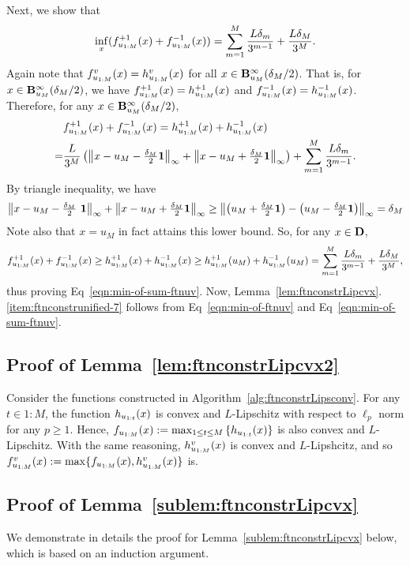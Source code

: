 Next, we show that
\begin{equation}
\label{eqn:min-of-sum-ftnuv}
\inf_x (f_{u_{1:M}}^{+1}(x) + f_{u_{1:M}}^{-1}(x)) =  \sum_{m=1}^{M} \frac{L\delta_m}{3^{m-1}}
+ \frac{L\delta_M}{3^M}.
\end{equation}
Again note that $f_{u_{1:M}}^v(x) = h^{v}_{u_{1:M}}(x)$ for all $x \in \mathbf{B}^\infty_{u_{M}}({\delta_{M}/2})$.
That is, for $x\in \mathbf{B}^\infty_{u_{M}}({\delta_{M}/2})$, we have $f_{u_{1:M}}^{+1}(x) = h^{+1}_{u_{1:M}}(x)$ and $f_{u_{1:M}}^{-1}(x) = h^{-1}_{u_{1:M}}(x)$.
Therefore, for any $x\in \mathbf{B}^\infty_{u_{M}}({\delta_{M}/2})$, 
\begin{align*}
&f_{u_{1:M}}^{+1}(x) + f_{u_{1:M}}^{-1}(x) 
= h^{+1}_{u_{1:M}}(x) + h^{-1}_{u_{1:M}}(x)\\
=& \frac{L}{3^M} \left(\left\|{x-u_M-\tfrac{\delta_M}{2}\mathbf{1}}\right\|_\infty + \left\|{x-u_M+\tfrac{\delta_M}{2}\mathbf{1}}\right\|_\infty\right)
+  \sum_{m=1}^{M} \frac{L\delta_m}{3^{m-1}}.
\end{align*}
By triangle inequality, we have
\begin{equation*}
\linf{x-u_M-\tfrac{\delta_M}{2} \ones} + \linf{x-u_M+\tfrac{\delta_M}{2}\ones} 
\geq
\linf{\left(u_M+\tfrac{\delta_M}{2} \ones\right)-\left( u_M-\tfrac{\delta_M}{2} \ones\right)}
=
\delta_M
\end{equation*}
Note also that $x = u_M$ in fact attains this lower bound.
So, for any $x \in \mathbf{D}$, 
\begin{equation*}
f_{u_{1:M}}^{+1}(x) + f_{u_{1:M}}^{-1}(x) \geq h^{+1}_{u_{1:M}}(x) + h^{-1}_{u_{1:M}}(x) 
\geq h^{+1}_{u_{1:M}}(u_M) + h^{-1}_{u_{1:M}}(u_M)
=  \sum_{m=1}^{M} \frac{L\delta_m}{3^{m-1}}	+ \frac{L\delta_M}{3^M},
\end{equation*}
thus proving Eq~\eqref{eqn:min-of-sum-ftnuv}.
Now, Lemma~\ref{lem:ftnconstrLipcvx}.\ref{item:ftnconstrunified-7} follows from Eq~\eqref{eqn:min-of-ftnuv} and Eq~\eqref{eqn:min-of-sum-ftnuv}.

\subsection{Proof of Lemma~\ref{lem:ftnconstrLipcvx2}}
\label{sec:proof-ftnconstrLipcvx2}
Consider the functions constructed in Algorithm~\ref{alg:ftnconstrLipsconv}. 
For any $t \in 1:M$, the function $h_{u_{1:{t}}}(x)$ is convex and $L$-Lipschitz 
with respect to $\ell_p$ norm for any $p \geq 1$. 
Hence,  $f_{u_{1:{M}}} (x) := \max_{1\leq t\leq M}\left\{h_{u_{1:{t}}}(x)\right\}$ is also convex and $L$-Lipschitz.
With the same reasoning, $h^{v}_{u_{1:M}}(x)$ is convex and $L$-Lipshcitz,
and so $f_{u_{1:M}}^v(x) := \max \{ f_{u_{1:{M}}}(x), h^{v}_{u_{1:M}}(x) \}$ is.

\subsection{Proof of Lemma~\ref{sublem:ftnconstrLipcvx}}
\label{sec:proof-ftnconstrLipcvxsublem}
We demonstrate in details the proof for Lemma~\ref{sublem:ftnconstrLipcvx} below,
which is based on an induction argument.
